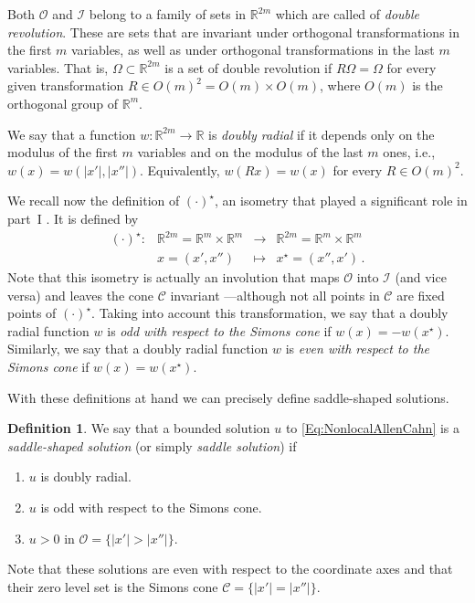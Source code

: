 \documentclass[12pt,reqno]{amsart}
\theoremstyle{definition}
\newtheorem{definition}[theorem]{Definition}
\theoremstyle{remark}
\newcommand{\con}[1]{\mathbb{#1}}
\newcommand{\R}{\con{R}} %
\newcommand{\ccal}{\mathscr{C}}
\newcommand{\ical}{\mathcal{I}}
\newcommand{\ocal}{\mathcal{O}}
\numberwithin{equation}{section}
\begin{document}
Both $\ocal$ and $\ical$ belong to a family of sets in $\R^{2m}$ which are called of \emph{double revolution}. These are sets that are invariant under orthogonal transformations in the first $m$ variables, as well as under orthogonal transformations in the last $m$ variables. That is, $\Omega\subset \R^{2m}$ is a set of double revolution if $R\Omega = \Omega$ for every given transformation $R\in O(m)^2 = O(m) \times O(m)$, where  $O(m)$ is the orthogonal group of $\R^m$.


We say that a function $w:\R^{2m}  \to \R$ is \emph{doubly radial} if it depends only on the modulus of the first $m$ variables and on the modulus of the last $m$ ones, i.e., $w(x) = w(|x'|,|x''|)$. Equivalently, $w(Rx) = w(x)$ for every $R \in O(m)^2$.

We recall now the definition of $(\cdot)^\star$, an isometry that played a significant role in part~I \cite{FelipeSanz-Perela:IntegroDifferentialI}. It is defined by
\begin{equation*}
\label{Eq:DefStar}
\begin{matrix}
(\cdot)^\star \colon & \R^{2m}= \R^{m}\times \R^{m}  &\to&  \R^{2m}= \R^{m}\times \R^{m}  \\
& x = (x',x'') &\mapsto & x^\star = (x'',x')\,.
\end{matrix}
\end{equation*}
Note that this isometry is actually an involution that maps $\ocal$ into $\ical$ (and vice versa) and leaves the cone $\ccal$ invariant ---although not all points in $\ccal$ are fixed points of $(\cdot)^\star$. Taking into account this transformation, we say that a doubly radial function $w$ is \emph{odd with respect to the Simons cone} if $w(x) = -w(x^\star)$. Similarly, we say that a doubly radial function $w$ is \emph{even with respect to the Simons cone} if $w(x) = w(x^\star)$.



With these definitions at hand we can precisely define saddle-shaped solutions.
\begin{definition}
	\label{Def:SaddleShapedSol}
	We say that a bounded solution $u$ to \eqref{Eq:NonlocalAllenCahn} is a \emph{saddle-shaped solution} (or simply \emph{saddle solution}) if
	\begin{enumerate}
		\item $u$ is doubly radial.
		\item $u$ is odd with respect to the Simons cone.
		\item $u > 0$ in $\ocal = \{|x'| > |x''|\} $.
	\end{enumerate}
\end{definition}
Note that these solutions are even with respect to the coordinate axes and that their zero level set is the Simons cone $\mathscr{C} = \{|x'|=|x''|\}$. 
\end{document}
